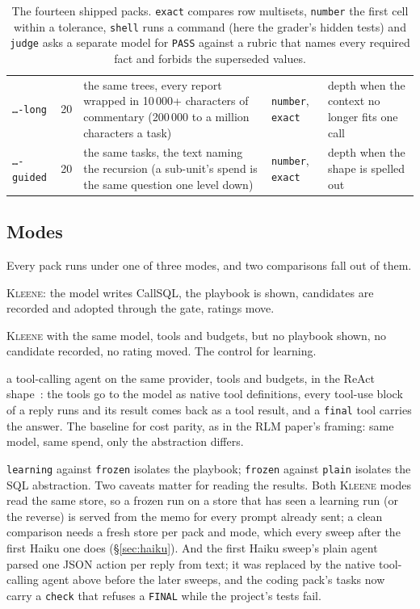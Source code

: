 \documentclass[11pt,a4paper]{article}
\newcommand{\kleene}{\textsc{Kleene}}
\newcommand{\callsql}{CallSQL}
\newcommand{\code}[1]{\texttt{#1}}
\begin{document}
\begin{table}[htbp]
\begin{tabularx}{\textwidth}{@{}l r Y l l@{}}
\code{\ldots-long} & 20 & the same trees, every report wrapped in 10\,000+ characters of commentary (200\,000 to a million characters a task) & \code{number}, \code{exact} & depth when the context no longer fits one call \\
\code{\ldots-guided} & 20 & the same tasks, the text naming the recursion (a sub-unit's spend is the same question one level down) & \code{number}, \code{exact} & depth when the shape is spelled out \\
\bottomrule
\end{tabularx}
\caption{The fourteen shipped packs. \code{exact} compares row multisets, \code{number}
the first cell within a tolerance, \code{shell} runs a command (here the grader's
hidden tests) and \code{judge} asks a separate model for \code{PASS} against a
rubric that names every required fact and forbids the superseded values.}
\label{tab:packs}
\end{table}

\subsection{Modes}

Every pack runs under one of three modes, and two comparisons fall out of them.

\begin{description}[leftmargin=1.5em,itemsep=1pt]
\item[\code{learning}] \kleene{}: the model writes \callsql, the playbook is
  shown, candidates are recorded and adopted through the gate, ratings move.
\item[\code{frozen}] \kleene{} with the same model, tools and budgets, but no
  playbook shown, no candidate recorded, no rating moved. The control for
  learning.
\item[\code{plain}] a tool-calling agent on the same provider, tools and
  budgets, in the ReAct shape~\citep{yao2023react}: the tools go to the model
  as native tool definitions, every tool-use block of a reply runs and its
  result comes back as a tool result, and a \code{final} tool carries the
  answer. The baseline for cost parity, as in the RLM paper's framing: same
  model, same spend, only the abstraction differs.
\end{description}

\code{learning} against \code{frozen} isolates the playbook; \code{frozen}
against \code{plain} isolates the SQL abstraction. Two caveats matter for
reading the results. Both \kleene{} modes read the same store, so a frozen run
on a store that has seen a learning run (or the reverse) is served from the
memo for every prompt already sent; a clean comparison needs a fresh store per
pack and mode, which every sweep after the first Haiku one does
(\S\ref{sec:haiku}). And the first Haiku sweep's plain agent parsed one JSON
action per reply from text; it was replaced by the native tool-calling agent
above before the later sweeps, and the coding pack's tasks now carry a
\code{check} that refuses a \code{FINAL} while the project's tests fail.
\end{document}
